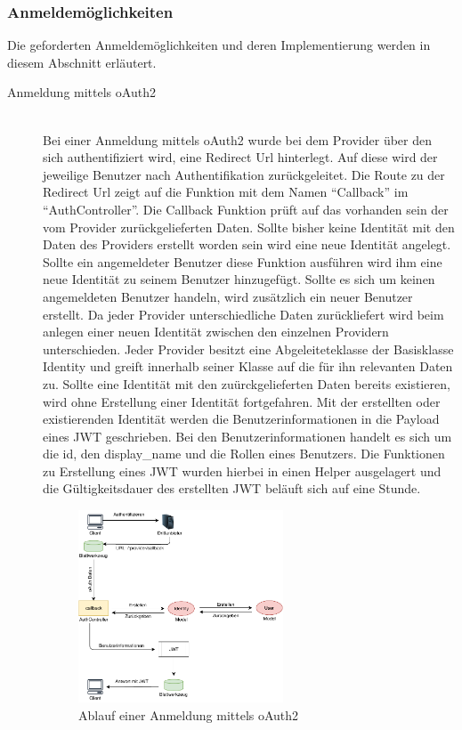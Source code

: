 \subsubsection*{Anmeldemöglichkeiten}
Die geforderten Anmeldemöglichkeiten und deren Implementierung werden in diesem Abschnitt erläutert. 
\begin{description}
	\item[Anmeldung mittels \gls{oAuth2}]\hfill\\
	Bei einer Anmeldung mittels \gls{oAuth2} wurde bei dem Provider über den sich authentifiziert wird, eine Redirect Url hinterlegt. Auf diese wird der jeweilige Benutzer nach Authentifikation zurückgeleitet. Die Route zu der Redirect Url zeigt auf die Funktion mit dem Namen \enquote{Callback} im \enquote{AuthController}. Die Callback Funktion prüft auf das vorhanden sein der vom Provider zurückgelieferten Daten. Sollte bisher keine Identität mit den Daten des Providers erstellt worden sein wird eine neue Identität angelegt. Sollte ein angemeldeter Benutzer diese Funktion ausführen wird ihm eine neue Identität zu seinem Benutzer hinzugefügt. Sollte es sich um keinen angemeldeten Benutzer handeln, wird zusätzlich ein neuer Benutzer erstellt. Da jeder Provider unterschiedliche Daten zurückliefert wird beim anlegen einer neuen Identität zwischen den einzelnen Providern unterschieden. Jeder Provider besitzt eine Abgeleiteteklasse der Basisklasse Identity und greift innerhalb seiner Klasse auf die für ihn relevanten Daten zu. Sollte eine Identität mit den zuürckgelieferten Daten bereits existieren, wird ohne Erstellung einer Identität fortgefahren. Mit der erstellten oder existierenden Identität werden die Benutzerinformationen in die Payload eines \gls{JWT} geschrieben. Bei den Benutzerinformationen handelt es sich um die id, den display\_name und die Rollen eines Benutzers. Die Funktionen zu Erstellung eines \gls{JWT} wurden hierbei in einen Helper ausgelagert und die Gültigkeitsdauer des erstellten \gls{JWT} beläuft sich auf eine Stunde.

	\begin{figure}[h]
		\centering
		\includegraphics[width=0.6\textwidth]{graphics/sign-in-oauth2.pdf}
		\caption{Ablauf einer Anmeldung mittels \gls{oAuth2}}
		\label{fig:server-sign-in-oauth}
	\end{figure}


\end{description}
